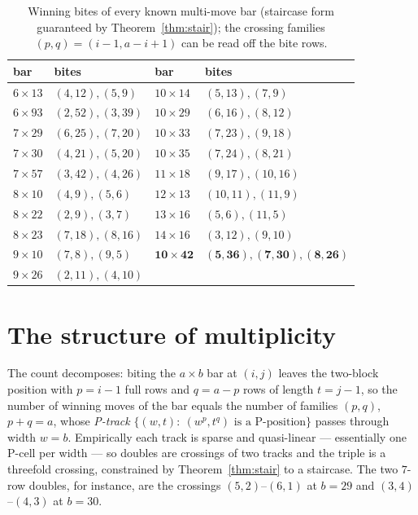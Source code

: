\documentclass[11pt]{article}
\begin{document}
\begin{table}[h]\centering
\caption{Winning bites of every known multi-move bar (staircase form guaranteed by
Theorem~\ref{thm:stair}); the crossing families $(p,q)=(i{-}1,a{-}i{+}1)$ can be read off
the bite rows.}\label{tab:bites}
\begin{tabular}{llll}
\toprule
bar & bites & bar & bites\\
\midrule
$6\times13$ & $(4,12),(5,9)$ & $10\times14$ & $(5,13),(7,9)$\\
$6\times93$ & $(2,52),(3,39)$ & $10\times29$ & $(6,16),(8,12)$\\
$7\times29$ & $(6,25),(7,20)$ & $10\times33$ & $(7,23),(9,18)$\\
$7\times30$ & $(4,21),(5,20)$ & $10\times35$ & $(7,24),(8,21)$\\
$7\times57$ & $(3,42),(4,26)$ & $11\times18$ & $(9,17),(10,16)$\\
$8\times10$ & $(4,9),(5,6)$ & $12\times13$ & $(10,11),(11,9)$\\
$8\times22$ & $(2,9),(3,7)$ & $13\times16$ & $(5,6),(11,5)$\\
$8\times23$ & $(7,18),(8,16)$ & $14\times16$ & $(3,12),(9,10)$\\
$9\times10$ & $(7,8),(9,5)$ & $\mathbf{10\times42}$ & $\mathbf{(5,36),(7,30),(8,26)}$\\
$9\times26$ & $(2,11),(4,10)$ & & \\
\bottomrule
\end{tabular}
\end{table}

\section{The structure of multiplicity}
The count decomposes: biting the $a\times b$ bar at $(i,j)$ leaves the two-block position
with $p=i-1$ full rows and $q=a-p$ rows of length $t=j-1$, so the number of winning moves of
the bar equals the number of families $(p,q)$, $p+q=a$, whose \emph{P-track}
$\{(w,t):\ (w^p,t^q)\text{ is a P-position}\}$ passes through width $w=b$. Empirically each
track is sparse and quasi-linear --- essentially one P-cell per width --- so doubles are
crossings of two tracks and the triple is a threefold crossing, constrained by
Theorem~\ref{thm:stair} to a staircase. The two $7$-row doubles, for instance, are the
crossings $(5,2)$--$(6,1)$ at $b=29$ and $(3,4)$--$(4,3)$ at $b=30$.
\end{document}
